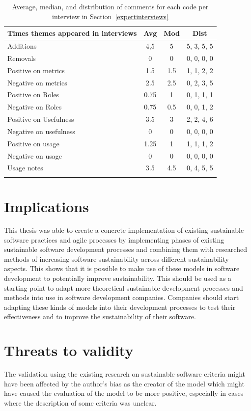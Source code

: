 \begin{longtable}{ |l|c|c|c| }
\hline
\textbf{Times themes appeared in interviews} & \textbf{Avg} & \textbf{Mod} & \textbf{Dist}\\
\hline
Additions & 4,5 & 5 & 5, 3, 5, 5\\
\hline
Removals & 0 & 0 & 0, 0, 0, 0 \\
\hline
Positive on metrics & 1.5 & 1.5 & 1, 1, 2, 2\\
\hline
Negative on metrics & 2.5 & 2.5 & 0, 2, 3, 5\\
\hline
Positive on Roles & 0.75 & 1 & 0, 1, 1, 1\\
\hline
Negative on Roles & 0.75 & 0.5 & 0, 0, 1, 2\\
\hline
Positive on Usefulness & 3.5 & 3 & 2, 2, 4, 6\\
\hline
Negative on usefulness & 0 & 0 & 0, 0, 0, 0\\
\hline
Positive on usage & 1.25 & 1 & 1, 1, 1, 2\\
\hline
Negative on usage & 0 & 0 & 0, 0, 0, 0\\
\hline
Usage notes & 3.5 & 4.5 & 0, 4, 5, 5\\
\hline
\caption{Average, median, and distribution of comments for each code per interview in Section~\ref{expertinterviews}}
\label{interviews}
\end{longtable}

\section{Implications}
This thesis was able to create a concrete implementation of existing sustainable software practices and agile processes by implementing phases of existing sustainable software development processes and combining them with researched methods of increasing software sustainability across different sustainability aspects. This shows that it is possible to make use of these models in software development to potentially improve sustainability. This should be used as a starting point to adapt more theoretical sustainable development processes and methods into use in software development companies. Companies should start adapting these kinds of models into their development processes to test their effectiveness and to improve the sustainability of their software.

\section{Threats to validity}
The validation using the existing research on sustainable software criteria might have been affected by the author's bias as the creator of the model which might have caused the evaluation of the model to be more positive, especially in cases where the description of some criteria was unclear.

